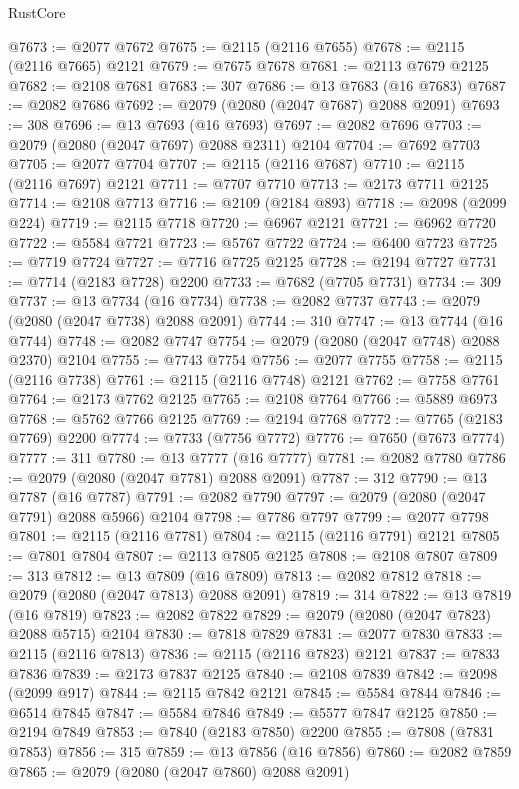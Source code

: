 \begin{lexlean}{RustCore}
\begin{coremodule}
@7673 := @2077 @7672
@7675 := @2115 (@2116 @7655)
@7678 := @2115 (@2116 @7665) @2121
@7679 := @7675 @7678
@7681 := @2113 @7679 @2125
@7682 := @2108 @7681
@7683 := 307
@7686 := @13 @7683 (@16 @7683)
@7687 := @2082 @7686
@7692 := @2079 (@2080 (@2047 @7687) @2088 @2091)
@7693 := 308
@7696 := @13 @7693 (@16 @7693)
@7697 := @2082 @7696
@7703 := @2079 (@2080 (@2047 @7697) @2088 @2311) @2104
@7704 := @7692 @7703
@7705 := @2077 @7704
@7707 := @2115 (@2116 @7687)
@7710 := @2115 (@2116 @7697) @2121
@7711 := @7707 @7710
@7713 := @2173 @7711 @2125
@7714 := @2108 @7713
@7716 := @2109 (@2184 @893)
@7718 := @2098 (@2099 @224)
@7719 := @2115 @7718
@7720 := @6967 @2121
@7721 := @6962 @7720
@7722 := @5584 @7721
@7723 := @5767 @7722
@7724 := @6400 @7723
@7725 := @7719 @7724
@7727 := @7716 @7725 @2125
@7728 := @2194 @7727
@7731 := @7714 (@2183 @7728) @2200
@7733 := @7682 (@7705 @7731)
@7734 := 309
@7737 := @13 @7734 (@16 @7734)
@7738 := @2082 @7737
@7743 := @2079 (@2080 (@2047 @7738) @2088 @2091)
@7744 := 310
@7747 := @13 @7744 (@16 @7744)
@7748 := @2082 @7747
@7754 := @2079 (@2080 (@2047 @7748) @2088 @2370) @2104
@7755 := @7743 @7754
@7756 := @2077 @7755
@7758 := @2115 (@2116 @7738)
@7761 := @2115 (@2116 @7748) @2121
@7762 := @7758 @7761
@7764 := @2173 @7762 @2125
@7765 := @2108 @7764
@7766 := @5889 @6973
@7768 := @5762 @7766 @2125
@7769 := @2194 @7768
@7772 := @7765 (@2183 @7769) @2200
@7774 := @7733 (@7756 @7772)
@7776 := @7650 (@7673 @7774)
@7777 := 311
@7780 := @13 @7777 (@16 @7777)
@7781 := @2082 @7780
@7786 := @2079 (@2080 (@2047 @7781) @2088 @2091)
@7787 := 312
@7790 := @13 @7787 (@16 @7787)
@7791 := @2082 @7790
@7797 := @2079 (@2080 (@2047 @7791) @2088 @5966) @2104
@7798 := @7786 @7797
@7799 := @2077 @7798
@7801 := @2115 (@2116 @7781)
@7804 := @2115 (@2116 @7791) @2121
@7805 := @7801 @7804
@7807 := @2113 @7805 @2125
@7808 := @2108 @7807
@7809 := 313
@7812 := @13 @7809 (@16 @7809)
@7813 := @2082 @7812
@7818 := @2079 (@2080 (@2047 @7813) @2088 @2091)
@7819 := 314
@7822 := @13 @7819 (@16 @7819)
@7823 := @2082 @7822
@7829 := @2079 (@2080 (@2047 @7823) @2088 @5715) @2104
@7830 := @7818 @7829
@7831 := @2077 @7830
@7833 := @2115 (@2116 @7813)
@7836 := @2115 (@2116 @7823) @2121
@7837 := @7833 @7836
@7839 := @2173 @7837 @2125
@7840 := @2108 @7839
@7842 := @2098 (@2099 @917)
@7844 := @2115 @7842 @2121
@7845 := @5584 @7844
@7846 := @6514 @7845
@7847 := @5584 @7846
@7849 := @5577 @7847 @2125
@7850 := @2194 @7849
@7853 := @7840 (@2183 @7850) @2200
@7855 := @7808 (@7831 @7853)
@7856 := 315
@7859 := @13 @7856 (@16 @7856)
@7860 := @2082 @7859
@7865 := @2079 (@2080 (@2047 @7860) @2088 @2091)

\end{coremodule}
\end{lexlean}
